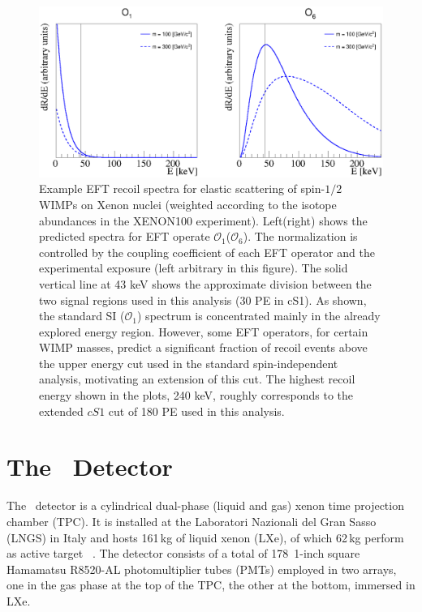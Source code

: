 \begin{figure}[t!]
\centerline{\includegraphics[width=1.\linewidth]{Figures/drdeO1O6.eps}}
\caption{Example EFT recoil spectra for elastic scattering of spin-$1/2$ WIMPs on Xenon nuclei (weighted according to the isotope abundances in the XENON100 experiment). Left(right) shows the predicted spectra for EFT operate $\mathcal{O}_1$($\mathcal{O}_6$). The normalization is controlled by the coupling coefficient of each EFT operator and the experimental exposure (left arbitrary in this figure). The solid vertical line at 43 keV shows the approximate division between the two signal regions used in this analysis (30 PE in cS1). As shown, the standard SI ($\mathcal{O}_1$) spectrum is concentrated mainly in the already explored energy region. However, some EFT operators, for certain WIMP masses, predict a significant fraction of recoil events above the upper energy cut used in the standard spin-independent analysis, motivating an extension of this cut. The highest recoil energy shown in the plots, 240 keV, roughly corresponds to the extended $cS1$ cut of 180 PE used in this analysis.}
\label{fig:dRdE}
\end{figure}

\section{The \Xehund\  Detector}
The \Xehund\ detector is a cylindrical %
dual-phase (liquid and gas) xenon time projection chamber (TPC). It is installed at the Laboratori Nazionali del Gran Sasso (LNGS) in Italy
and hosts 161\,kg of liquid xenon (LXe), of which 62\,kg perform as active target ~\cite{xe100_instr2012}. 
The detector consists of a total of 178~1-inch square Hamamatsu R8520-AL photomultiplier tubes (PMTs) employed in two arrays, one in the gas phase at the top of the TPC,
the other at the bottom, immersed in LXe. 


